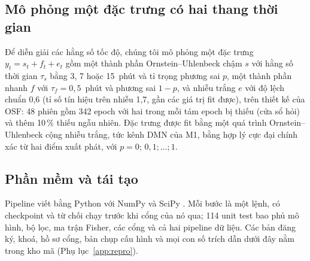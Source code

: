 \subsection{Mô phỏng một đặc trưng có hai thang thời gian}
\label{sec:simmethods}
Để diễn giải các hằng số tốc độ, chúng tôi mô phỏng một đặc trưng $y_t=s_t+f_t+e_t$ gồm một thành phần Ornstein--Uhlenbeck chậm $s$ với hằng số thời gian $\tau_s$ bằng 3, 7 hoặc 15~phút và tỉ trọng phương sai $p$, một thành phần nhanh $f$ với $\tau_f=0{,}5$~phút và phương sai $1-p$, và nhiễu trắng $e$ với độ lệch chuẩn 0,6 (tỉ số tín hiệu trên nhiễu 1,7, gần các giá trị fit được), trên thiết kế của OSF: 48 phiên gồm 342 epoch với hai trong mỗi tám epoch bị thiếu (cửa sổ hỏi) và thêm 10\,\% thiếu ngẫu nhiên. Đặc trưng được fit bằng một quá trình Ornstein--Uhlenbeck cộng nhiễu trắng, tức kênh DMN của M1, bằng hợp lý cực đại chính xác từ hai điểm xuất phát, với $p=0;\,0{,}1;\dots;1$.

\subsection{Phần mềm và tái tạo}
\label{sec:software}
Pipeline viết bằng Python với NumPy và SciPy \cite{Harris2020,Virtanen2020}. Mỗi bước là một lệnh, có checkpoint và từ chối chạy trước khi cổng của nó qua; 114 unit test bao phủ mô hình, bộ lọc, ma trận Fisher, các cổng và cả hai pipeline dữ liệu. Các bản đăng ký, khoá, hồ sơ cổng, bản chụp cấu hình và mọi con số trích dẫn dưới đây nằm trong kho mã (Phụ lục~\ref{app:repro}).
